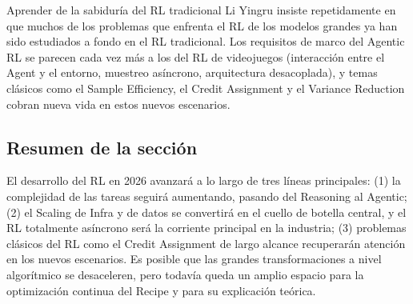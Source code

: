 \begin{knowledgebox}{Aprender de la sabiduría del RL tradicional}
Li Yingru insiste repetidamente en que muchos de los problemas que enfrenta el RL de los modelos grandes ya han sido estudiados a fondo en el RL tradicional. Los requisitos de marco del Agentic RL se parecen cada vez más a los del RL de videojuegos (interacción entre el Agent y el entorno, muestreo asíncrono, arquitectura desacoplada), y temas clásicos como el Sample Efficiency, el Credit Assignment y el Variance Reduction cobran nueva vida en estos nuevos escenarios.
\end{knowledgebox}

\subsection{Resumen de la sección}

El desarrollo del RL en 2026 avanzará a lo largo de tres líneas principales: (1) la complejidad de las tareas seguirá aumentando, pasando del Reasoning al Agentic; (2) el Scaling de Infra y de datos se convertirá en el cuello de botella central, y el RL totalmente asíncrono será la corriente principal en la industria; (3) problemas clásicos del RL como el Credit Assignment de largo alcance recuperarán atención en los nuevos escenarios. Es posible que las grandes transformaciones a nivel algorítmico se desaceleren, pero todavía queda un amplio espacio para la optimización continua del Recipe y para su explicación teórica.

